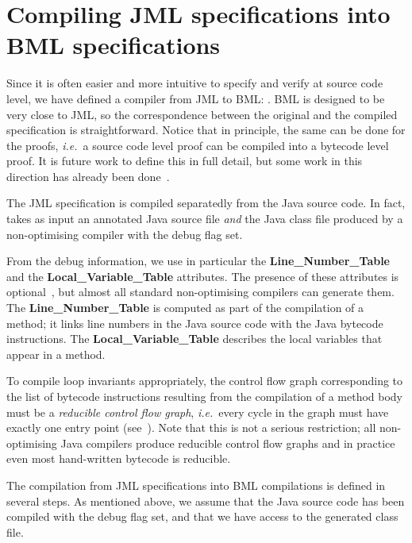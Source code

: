 \section{Compiling JML specifications into BML specifications}\label{SecJMLtoBML} 

Since it is often easier and more intuitive to specify and verify at
source code level, we have defined a compiler from JML to BML:
\JMLtoBML. BML is designed to be very close to JML, so the
correspondence between the original and the compiled specification
is straightforward. Notice that in principle, the same can be
done for the proofs,
\emph{i.e.}\ a source code level proof can be compiled into a
bytecode level proof. It is future work to define this in full detail,
but some work in this direction has already been
done~\cite{BartheRS05}.

The JML specification is compiled separatedly from the Java source
code. In fact, \JMLtoBML takes as input an annotated Java source file
\emph{and} the Java class file produced by a non-optimising compiler
with the debug flag set. %

From the debug information, we use in particular the
\textbf{Line\_Number\_Table} and the \textbf{Local\_Variable\_Table}
attributes. The presence of these attributes is
optional~\cite{JVMspec}, but almost all standard non-optimising
compilers can generate them. The \textbf{Line\_Number\_Table} is
computed as part of the compilation of a method; it links line numbers
in the Java source code with the Java bytecode instructions.  The
\textbf{Local\_Variable\_Table} describes the local variables that
appear in a method.  

To compile loop invariants appropriately, the control flow graph
corresponding to the list of bytecode instructions resulting from the
compilation of a method body must be a
\emph{reducible control flow graph}, \emph{i.e.}\ every 
cycle in the graph must have exactly one entry point
(see~\cite{AhoSU86}). Note that this is not a serious restriction; all
non-optimising Java compilers produce reducible control flow graphs
and in practice even most hand-written bytecode is reducible.

The compilation from JML specifications into BML compilations is
defined in several steps. As mentioned above, we assume that the Java
source code has been compiled with the debug flag set, and that we
have access to the generated class file.

